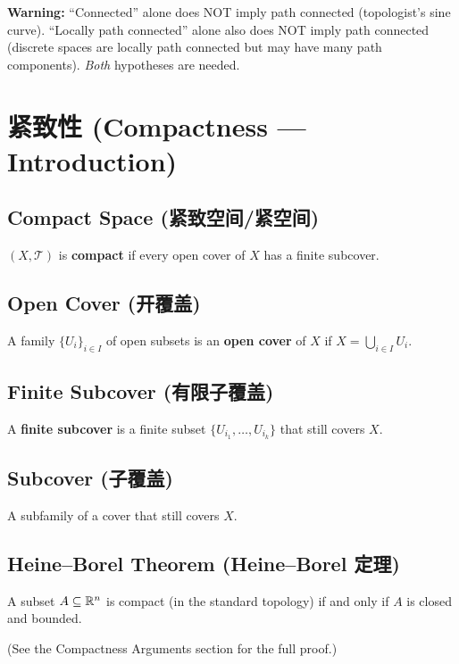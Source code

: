 \documentclass{article}
\begin{document}
\textbf{Warning:} ``Connected'' alone does NOT imply path connected
(topologist's sine curve). ``Locally path connected'' alone also does NOT
imply path connected (discrete spaces are locally path connected but may
have many path components). \emph{Both} hypotheses are needed.

\section{紧致性 (Compactness --- Introduction)}

\subsection{Compact Space (紧致空间/紧空间)}\label{def:compact}
\begin{definition}
  $(X, \mathcal{T})$ is \textbf{compact} if every open cover of $X$
  has a finite subcover.
\end{definition}

\subsection{Open Cover (开覆盖)}\label{def:open-cover}
A family $\{U_i\}_{i \in I}$ of open subsets is an \textbf{open
cover} of $X$ if $X = \bigcup_{i \in I} U_i$.

\subsection{Finite Subcover (有限子覆盖)}\label{def:finite-subcover}
A \textbf{finite subcover} is a finite subset $\{U_{i_1}, \ldots,
U_{i_k}\}$ that still covers $X$.

\subsection{Subcover (子覆盖)}\label{def:subcover}
A subfamily of a cover that still covers $X$.

\subsection{Heine--Borel Theorem (Heine--Borel 定理)}\label{def:heine-borel}
\begin{theorem}
  A subset $A \subseteq \mathbb{R}^n$ is compact (in the standard topology)
  if and only if $A$ is closed and bounded.
\end{theorem}
(See the Compactness Arguments section for the full proof.)
\end{document}
